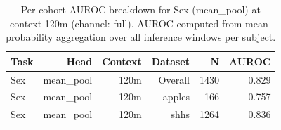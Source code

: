 \begin{table}[ht]
\centering
\caption{Per-cohort AUROC breakdown for Sex (mean_pool) at context 120m (channel: full). AUROC computed from mean-probability aggregation over all inference windows per subject.}
\label{tab:cohort_sex_binary_mean_pool_full}
\begin{tabular}{lrrrrr}
\toprule
Task & Head & Context & Dataset & N & AUROC \\
\midrule
Sex & mean_pool & 120m & Overall & 1430 & 0.829 \\
Sex & mean_pool & 120m & apples & 166 & 0.757 \\
Sex & mean_pool & 120m & shhs & 1264 & 0.836 \\
\bottomrule
\end{tabular}
\end{table}